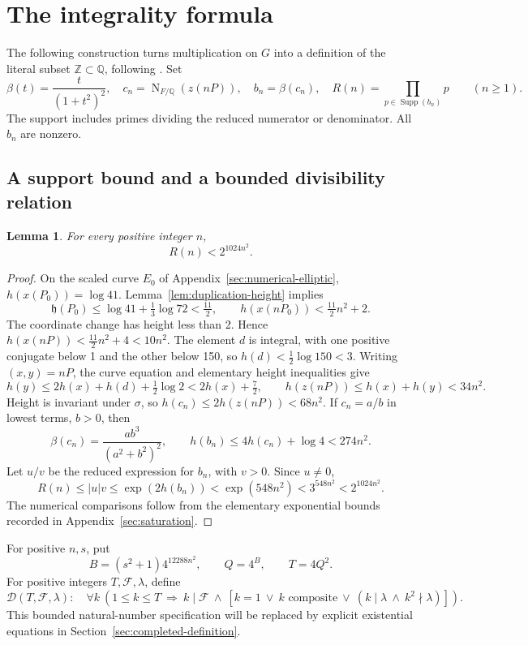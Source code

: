 \documentclass[11pt]{article}
\newtheorem{lemma}[theorem]{Lemma}
\theoremstyle{definition}
\newcommand{\Q}{\mathbb Q}\newcommand{\Z}{\mathbb Z}
\newcommand{\Norm}{\operatorname{N}}
\newcommand{\Supp}{\operatorname{Supp}}
\begin{document}
\section{The integrality formula}\label{sec:integers}
The following construction turns multiplication on \(G\) into a
definition of the literal subset \(\Z\subset\Q\), following
\cite[Sections 5--7]{Conant}.
Set
\[
 \beta(t)=\frac{t}{(1+t^2)^2},\quad
 c_n=\Norm_{F/\Q}(z(nP)),\quad b_n=\beta(c_n),\quad
 R(n)=\prod_{p\in\Supp(b_n)}p\qquad(n\ge1).
\]
The support includes primes dividing the reduced numerator or denominator.
All \(b_n\) are nonzero.

\subsection{A support bound and a bounded divisibility relation}
\begin{lemma}\label{lem:support-majorant}
For every positive integer \(n\),
\[
                         R(n)<2^{1024n^2}.
\]
\end{lemma}
\begin{proof}
On the scaled curve \(E_0\) of Appendix~\ref{sec:numerical-elliptic},
\(h(x(P_0))=\log41\). Lemma~\ref{lem:duplication-height} implies
\[
 \mathfrak h(P_0)\le\log41+\tfrac13\log72<\tfrac{11}{2},
 \qquad
 h(x(nP_0))<\tfrac{11}{2}n^2+2.
\]
The coordinate change has height less than 2. Hence
\(h(x(nP))<\tfrac{11}{2}n^2+4<10n^2\).
The element \(d\) is integral, with one positive conjugate below
1 and the other below 150, so \(h(d)<\tfrac12\log150<3\).
Writing \((x,y)=nP\), the curve equation and elementary height
inequalities give
\[
 h(y)\le2h(x)+h(d)+\tfrac12\log2<2h(x)+\tfrac72,
 \qquad h(z(nP))\le h(x)+h(y)<34n^2.
\]
Height is invariant under \(\sigma\), so
\(h(c_n)\le2h(z(nP))<68n^2\). If \(c_n=a/b\) in lowest
terms, \(b>0\), then
\[
 \beta(c_n)=\frac{ab^3}{(a^2+b^2)^2},\qquad
 h(b_n)\le4h(c_n)+\log4<274n^2.
\]
Let \(u/v\) be the reduced expression for \(b_n\), with
\(v>0\). Since \(u\ne0\),
\[
 R(n)\le |u|v\le\exp(2h(b_n))
       <\exp(548n^2)<3^{548n^2}<2^{1024n^2}.
\]
The numerical comparisons follow from the elementary exponential
bounds recorded in Appendix~\ref{sec:saturation}.
\end{proof}

For positive \(n,s\), put
\begin{equation}\label{eq:majorant-bound}
 B=(s^2+1)4^{12288n^2},\qquad Q=4^B,\qquad T=4Q^2.
\end{equation}
For positive integers \(T,\mathcal F,\lambda\), define
\begin{equation}\label{eq:divisibility-replacement}
 \mathcal D(T,\mathcal F,\lambda):\quad
 \forall k\ (1\le k\le T\ \Longrightarrow\
 k\mid \mathcal F\ \wedge\ [k=1\ \vee\ k\text{ composite}\ \vee\
                  (k\mid\lambda\ \wedge\ k^2\nmid\lambda)]).
\end{equation}
This bounded natural-number specification will be replaced by explicit
existential equations in Section~\ref{sec:completed-definition}.
\end{document}
